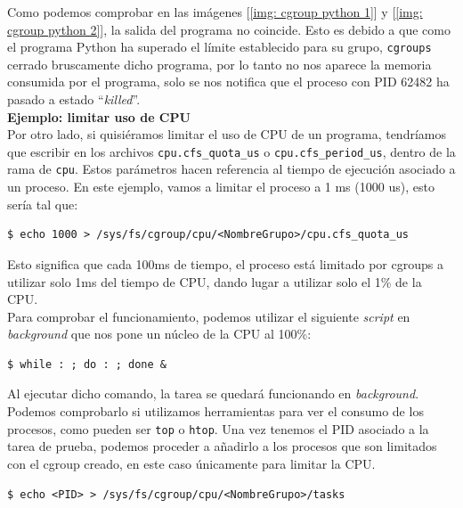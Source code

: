 \documentclass[a4paper, oneside, 12pt]{book}
\begin{document}
	\pagebreak
	
	\noindent Como podemos comprobar en las imágenes [\ref{img: cgroup python 1}] y [\ref{img: cgroup python 2}], la salida del programa no coincide. Esto es debido a que como el programa Python ha superado el límite establecido para su grupo, \texttt{cgroups} cerrado bruscamente dicho programa, por lo tanto no nos aparece la memoria consumida por el programa, solo se nos notifica que el proceso con PID 62482 ha pasado a estado ``\textit{killed}''. \\
	
	\vspace{10px}
	\noindent \textbf{\large Ejemplo: limitar uso de CPU}\\
	
	\noindent Por otro lado, si quisiéramos limitar el uso de CPU de un programa, tendríamos que escribir en los archivos \texttt{cpu.cfs\_quota\_us} o \texttt{cpu.cfs\_period\_us}, dentro de la rama de \texttt{cpu}. Estos parámetros hacen referencia al tiempo de ejecución asociado a un proceso. En este ejemplo, vamos a limitar el proceso a 1 ms (1000 us), esto sería tal que:
	
	\begin{verbatim}
$ echo 1000 > /sys/fs/cgroup/cpu/<NombreGrupo>/cpu.cfs_quota_us
	\end{verbatim}

	\noindent Esto significa que cada 100ms de tiempo, el proceso está limitado por cgroups a utilizar solo 1ms del tiempo de CPU, dando lugar a utilizar solo el 1\% de la CPU. \\

	\noindent Para comprobar el funcionamiento, podemos utilizar el siguiente \textit{script} en \textit{background} que nos pone un núcleo de la CPU al 100\%:
	\begin{verbatim}
$ while : ; do : ; done &
	\end{verbatim}

	\noindent Al ejecutar dicho comando, la tarea se quedará funcionando en \textit{background}. Podemos comprobarlo si utilizamos herramientas para ver el consumo de los procesos, como pueden ser \texttt{top} o \texttt{htop}. Una vez tenemos el PID asociado a la tarea de prueba, podemos proceder a añadirlo a los procesos que son limitados con el cgroup creado, en este caso únicamente para limitar la CPU.
	\begin{verbatim}
$ echo <PID> > /sys/fs/cgroup/cpu/<NombreGrupo>/tasks
	\end{verbatim}
\end{document}
